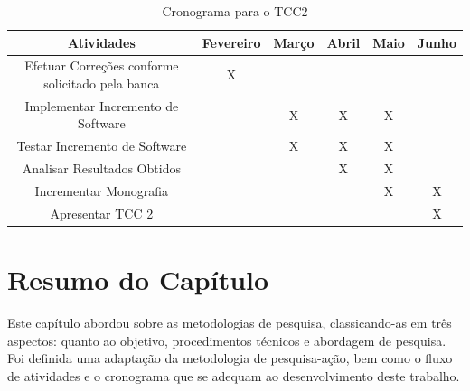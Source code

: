 \begin{table}[]
  \tiny
  \centering
  \caption{Cronograma para o TCC2}
  \label{cronograma-tcc-2}
  \begin{tabular}{| c | c | c | c | c | c |}
  \hline
    Atividades & Fevereiro & Março & Abril & Maio & Junho \\ \hline
    Efetuar Correções conforme solicitado pela banca & X &  &  &  &  \\
    Implementar Incremento de Software &  & X & X & X &  \\
    Testar Incremento de Software &  & X & X & X &  \\
    Analisar Resultados Obtidos &  &  & X & X &  \\
    Incrementar Monografia &  &  &  & X & X \\
    Apresentar TCC 2 &  &  &  &  & X \\ \hline
  \end{tabular}
\end{table}
  
  \section{Resumo do Capítulo}
  Este capítulo abordou sobre as metodologias de pesquisa, classicando-as em três aspectos: quanto ao objetivo, procedimentos técnicos e abordagem de pesquisa. Foi definida uma adaptação da metodologia de pesquisa-ação, bem como o fluxo de atividades e o cronograma que se adequam ao desenvolvimento deste trabalho.